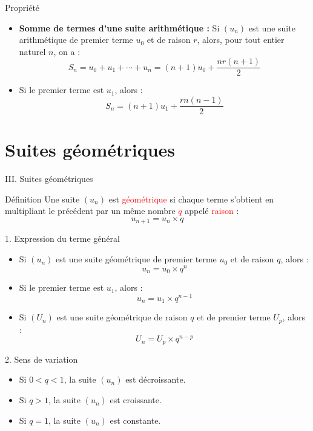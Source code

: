 \documentclass{beamer}
\begin{document}
\begin{frame}{Propriété}
    \begin{itemize}
        \item \textbf{Somme de termes d'une suite arithmétique :}
            Si $\left(u_{n}\right)$ est une suite arithmétique de premier terme $u_{0}$ et de raison $r$, alors, pour tout entier naturel $n$, on a :
            \[
            S_{n}=u_{0}+u_{1}+\cdots +u_{n}=\left(n+1\right)u_{0}+\dfrac{nr\left(n+1\right)}{2}
            \]
        \item Si le premier terme est $u_{1}$, alors :
            \[
            S_{n}=\left(n+1\right)u_{1}+\dfrac{rn\left(n-1\right)}{2}
            \]
    \end{itemize}
\end{frame}

\section{Suites géométriques}
\begin{frame}{III. Suites géométriques}
    \begin{block}{Définition}
        Une suite $\left(u_{n}\right)$ est \textcolor{red}{géométrique} si chaque terme s'obtient en multipliant le précédent par un même nombre \textcolor{red}{$q$} appelé \textcolor{red}{raison} :
        \[
        u_{n+1}=u_{n}\times q
        \]
    \end{block}
\end{frame}

\begin{frame}{1. Expression du terme général}
    \begin{itemize}
        \item Si $\left(u_{n}\right)$ est une suite géométrique de premier terme $u_{0}$ et de raison $q$, alors :
            \[u_{n}=u_{0}\times q^{n}\]
        \item Si le premier terme est $u_{1}$, alors :
            \[u_{n}=u_{1}\times q^{n-1}\]
        \item Si $(U_n)$ est une suite géométrique de raison $q$ et de premier terme $U_{p}$, alors :
            \[U_{n}=U_{p}\times q^{n-p}\]
    \end{itemize}
\end{frame}

\begin{frame}{2. Sens de variation}
    \begin{itemize}
        \item Si $0 < q < 1$, la suite $\left(u_{n}\right)$ est décroissante.
        \item Si $q > 1$, la suite $\left(u_{n}\right)$ est croissante.
        \item Si $q=1$, la suite $\left(u_{n}\right)$ est constante.
    \end{itemize}
\end{frame}
\end{document}
